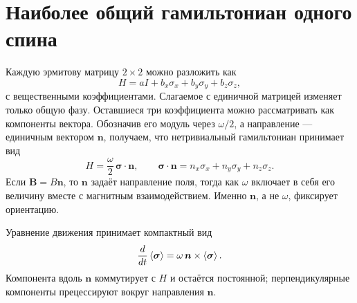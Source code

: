 \section{Наиболее общий гамильтониан одного спина}

Каждую эрмитову матрицу \(2\times2\) можно разложить как
\begin{equation}
H=aI+b_x\sigma_x+b_y\sigma_y+b_z\sigma_z,
\end{equation}
с вещественными коэффициентами. Слагаемое с единичной матрицей изменяет только общую фазу. Оставшиеся три коэффициента можно рассматривать как компоненты вектора. Обозначив его модуль через \(\omega/2\), а направление — единичным вектором \(\bm n\), получаем, что нетривиальный гамильтониан принимает вид
\begin{equation}
H=\frac{\omega}{2}\,\bm\sigma\cdot\bm n,
\qquad
\bm\sigma\cdot\bm n
=n_x\sigma_x+n_y\sigma_y+n_z\sigma_z.
\label{eq:l5-general-spin-h}
\end{equation}
Если \(\bm B=B\bm n\), то \(\bm n\) задаёт направление поля, тогда как \(\omega\) включает в себя его величину вместе с магнитным взаимодействием. Именно \(\bm n\), а не \(\omega\), фиксирует ориентацию.

Уравнение движения принимает компактный вид
\begin{equation}
\frac{d}{dt}\left\langle\bm\sigma\right\rangle
=\omega\,\bm n\times\left\langle\bm\sigma\right\rangle.
\end{equation}
Компонента вдоль \(\bm n\) коммутирует с \(H\) и остаётся постоянной; перпендикулярные компоненты прецессируют вокруг направления \(\bm n\).

\begin{classroomqa}
\end{classroomqa}

\begin{classroomqa}
\end{classroomqa}

